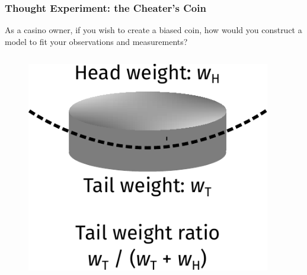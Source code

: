 \documentclass[10pt,aspectratio=169]{beamer}
\begin{document}
\begin{frame}
  \frametitle{Thought Experiment: the Cheater’s Coin}

  As a casino owner, if you wish to create a biased coin, how would
  you construct a model to fit your observations and measurements?

  \vfill
  \begin{columns}
    \begin{column}{0.25\textwidth}
      \begin{figure}[t]
        \centering \includegraphics[width=\textwidth]{images/coin.pdf}
      \end{figure}
    \end{column}
    \begin{column}{0.75\textwidth}
    \end{column}
  \end{columns}

\end{frame}
\end{document}
